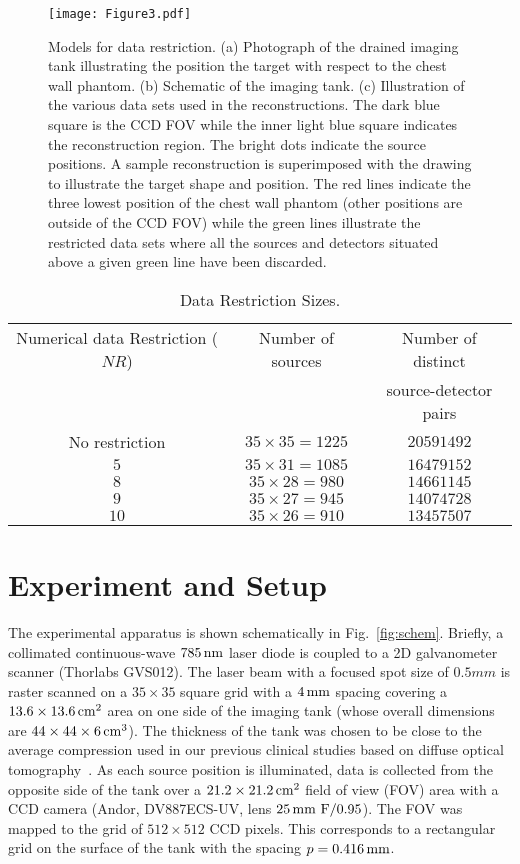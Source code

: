 \begin{figure}[htbp]
\centering\texttt{[image: Figure3.pdf]}
\caption{\label{fig:data}
  Models for data restriction. (a) Photograph of the drained imaging tank illustrating the position the target with respect to the chest wall phantom. (b) Schematic of the imaging tank. (c) Illustration of  the various data sets used in the reconstructions. The dark blue square is the CCD FOV while the inner light blue square indicates the reconstruction region. The bright dots indicate the source positions. A sample reconstruction is superimposed with the drawing to illustrate the target shape and position. The red lines indicate the three lowest position of the chest wall phantom (other positions are outside of the CCD FOV) while the green lines illustrate the restricted data sets where all the sources and detectors situated above a given green line have been discarded.}
\end{figure}

\begin{table}[t]
\centering\caption{Data Restriction Sizes.}
\begin{tabular}{c|c|c}
\hline 
Numerical data Restriction ($NR$) & Number of sources & 
Number of distinct \\
&& source-detector pairs \\ \hline
No restriction & $35\times35=1225$ & $20591492$ \\
           $5$ & $35\times31=1085$ & $16479152$ \\
           $8$ & $35\times28=980$  & $14661145$ \\
           $9$ & $35\times27=945$  & $14074728$ \\
          $10$ & $35\times26=910$  & $13457507$ \\ \hline
\end{tabular}
\end{table}


\section{Experiment and Setup}

The experimental apparatus is shown schematically in Fig.~\ref{fig:schem}.  Briefly, a collimated continuous-wave $785\,{\rm nm}$ laser diode is coupled to a 2D galvanometer scanner (Thorlabs GVS012). The laser beam with a focused spot size of $0.5 mm$ is raster scanned on a $35\times 35$ square grid
with a $4\,{\rm mm}$ spacing covering a $13.6\times 13.6\,{\rm cm}^2$ area on one side of the imaging tank (whose overall dimensions are $44\times 44\times 6\,{\rm cm}^3$). The thickness of the tank was chosen to be close to the average compression used in our previous clinical studies based on diffuse optical tomography~\cite{choe_09_1, culver_03_1}. As each source position is illuminated, data is collected from the opposite side of the tank over a $21.2\times 21.2\,{\rm cm}^2$ field of view (FOV) area with a CCD camera (Andor, DV887ECS-UV, lens $25\,{\rm mm}\ {\rm F}/0.95$). The FOV was mapped to the grid of $512\times 512$ CCD pixels. This corresponds to a rectangular grid on the surface of the tank with the spacing $p=0.416\,{\rm mm}$.

